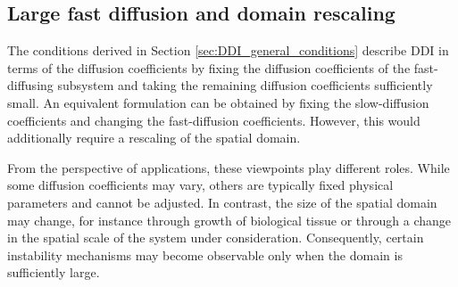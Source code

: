 \documentclass[12pt, a4paper]{amsart}
\numberwithin{equation}{section}
\begin{document}
\subsection{Large fast diffusion and domain rescaling}

The conditions derived in Section \ref{sec:DDI_general_conditions} describe DDI in terms of the diffusion coefficients by fixing the diffusion coefficients of the fast-diffusing subsystem and taking the remaining diffusion coefficients sufficiently small.
An equivalent formulation can be obtained by fixing the slow-diffusion coefficients and changing the fast-diffusion coefficients. However, this would additionally require a rescaling of the spatial domain.

{From the perspective of applications, these viewpoints play
different roles. While some diffusion coefficients may vary, others are
typically fixed physical parameters and cannot be adjusted. In contrast,
the size of the spatial domain may change, for instance through growth
of biological tissue or through a change in the spatial scale of the
system under consideration. Consequently, certain instability mechanisms
may become observable only when the domain is sufficiently large.}


\end{document}
